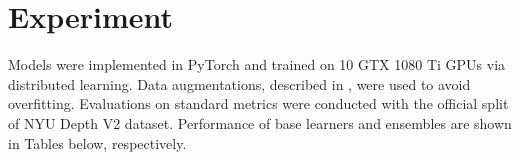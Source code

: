 \documentclass[conference]{IEEEtran}
\begin{document}

\section{Experiment}
Models were implemented in PyTorch and trained on 10 GTX 1080 Ti GPUs via distributed learning. Data augmentations, described in \cite{adabins}, were used to avoid overfitting. Evaluations on standard metrics were conducted with the official split of NYU Depth V2 dataset. Performance of base learners and ensembles are shown in Tables below, respectively.



\vspace{-0.4cm}



\nocite{*}

\end{document}
